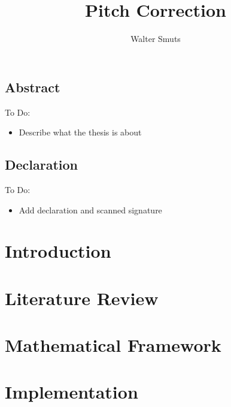 \documentclass[12pt, twoside, openright]{report}
\title{Pitch Correction}
\author{Walter Smuts}
\begin{document}
\maketitle
\newpage\null\newpage

\section*{Abstract}

{\color{red}
To Do:
\begin{itemize}
	\item Describe what the thesis is about
\end{itemize}
\color{black}
}

\newpage
\section*{Declaration}

{\color{red}
To Do:
\begin{itemize}
	\item Add declaration and scanned signature
\end{itemize}
}

\tableofcontents

\chapter{Introduction}

\setcounter{page}{1}

\Blindtext

\chapter{Literature Review}

\blindtext
\blinddescription
\Blindtext
\Blindtext

\chapter{Mathematical Framework}

\blindmathpaper

\chapter{Implementation}

\blindtext
\blinditemize
\blindtext
\blindenumerate
\Blindtext
\blinditemize
\Blindtext
\blinddescription
\Blindtext
\end{document}
